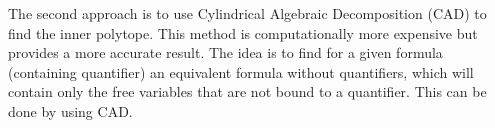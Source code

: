 
The second approach is to use Cylindrical Algebraic Decomposition (CAD) to find the inner polytope.
This method is computationally more expensive but provides a more accurate result.
The idea is to find for a given formula (containing quantifier) an equivalent formula without quantifiers, which will contain only the free variables
that are not bound to a quantifier.
This can be done by using CAD.

